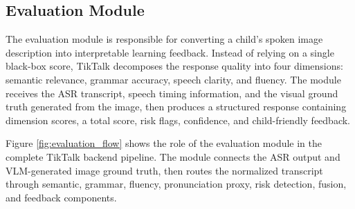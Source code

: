 \documentclass{article}
\begin{document}
\subsection{Evaluation Module}
The evaluation module is responsible for converting a child's spoken image description into interpretable learning feedback. Instead of relying on a single black-box score, TikTalk decomposes the response quality into four dimensions: semantic relevance, grammar accuracy, speech clarity, and fluency. The module receives the ASR transcript, speech timing information, and the visual ground truth generated from the image, then produces a structured response containing dimension scores, a total score, risk flags, confidence, and child-friendly feedback.

Figure \ref{fig:evaluation_flow} shows the role of the evaluation module in the complete TikTalk backend pipeline. The module connects the ASR output and VLM-generated image ground truth, then routes the normalized transcript through semantic, grammar, fluency, pronunciation proxy, risk detection, fusion, and feedback components.
\end{document}
